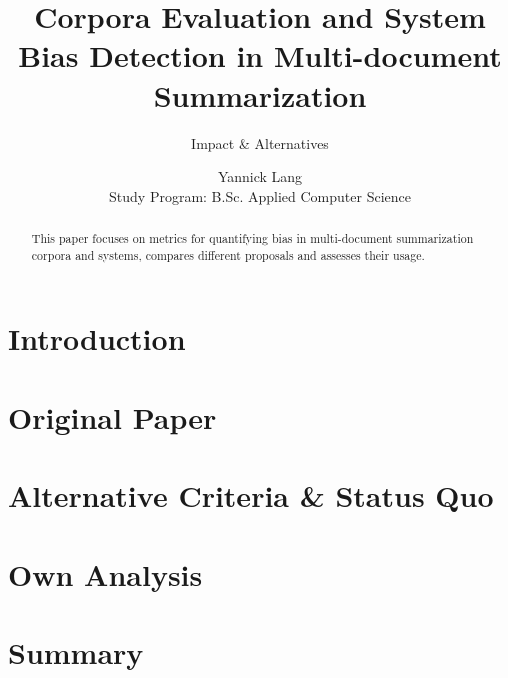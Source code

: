 \documentclass[runningheads]{llncs}
\begin{document}
\title{Corpora Evaluation and System Bias Detection in Multi-document Summarization}
\subtitle{Impact \& Alternatives}
\author{Yannick Lang \\
    \small Study Program: B.Sc. Applied Computer Science }

\maketitle              %


\begin{abstract}
    This paper focuses   on metrics for quantifying bias in multi-document summarization corpora and systems, compares different proposals and assesses their usage.
    
    
\end{abstract}

\section{Introduction}
\label{sec:introcution}


\section{Original Paper}
\label{sec:original-paper}


\section{Alternative Criteria \& Status Quo}
\label{sec:alternative-criteria}


\section{Own Analysis}
\label{sec:analysis}


\section{Summary}
\label{sec:summary}





\end{document}

